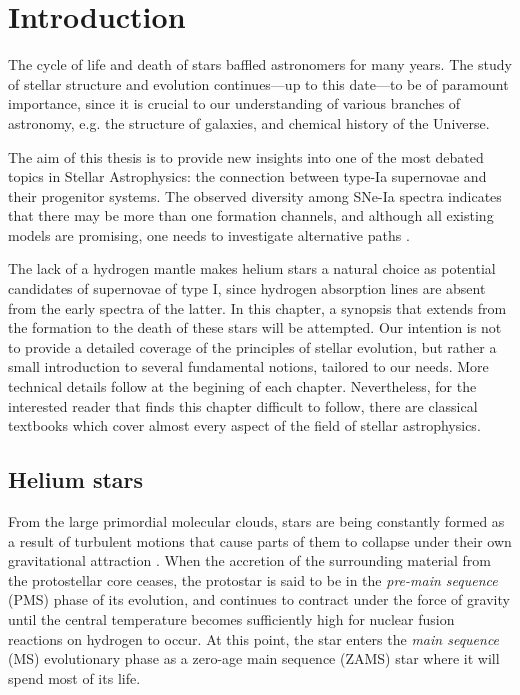 \documentclass[../../main/thesis_msc.tex]{subfiles}
\begin{document}
    \chapter{Introduction}
    
		The cycle of life and death of stars  baffled astronomers for many years. The study of stellar structure and evolution continues---up to this date---to be of paramount importance, since it is crucial to our understanding of various branches of astronomy, e.g. the structure of galaxies, and chemical history of the Universe.
		
		The aim of this thesis is to provide new insights into one of the most debated topics in Stellar Astrophysics: the connection between type-Ia supernovae and their progenitor systems. The observed diversity among SNe-Ia spectra indicates that there may be more than one formation channels, and although all existing models are promising, one needs to investigate alternative paths \citep[e.g.][]{Nomoto1378, Iben1997:book, langer:2000A&A, Hillebrandt2000}.
		
		The lack of a hydrogen mantle makes helium stars a natural choice as potential candidates of supernovae of type I, since hydrogen absorption lines are absent from the early spectra of the latter. In this chapter, a synopsis that extends from the formation to the death of these stars will be attempted. Our intention is not to provide a detailed coverage of the principles of stellar evolution, but rather a small introduction to several fundamental notions, tailored to our needs. More technical details follow at the begining of each chapter. Nevertheless, for the interested reader that finds this chapter difficult to follow, there are classical textbooks \citep{Kipp_book, Clayton, Prialnik, Eggleton_book} which cover almost every aspect of the field of stellar astrophysics.
		

    
    
    \section{Helium stars}
    	
    	From the large primordial molecular clouds, stars are being constantly formed as a result of turbulent motions that cause parts of them to collapse under their own gravitational attraction \citep{Klessen:2011, jappsen:2004}. When the accretion of the surrounding material from the protostellar core ceases, the protostar is said to be in the \emph{pre-main sequence} (PMS) phase of its evolution, and continues to contract under the force of gravity until the central temperature becomes sufficiently high for nuclear fusion reactions on hydrogen to occur. At this point, the star enters the \emph{main sequence} (MS) evolutionary phase as a zero-age main sequence (ZAMS) star where it will spend most of its life.
    	
\end{document}
